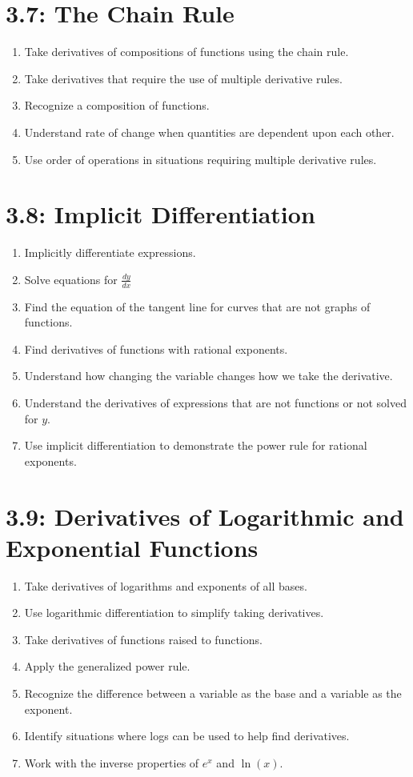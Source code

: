 \documentclass[11pt]{article}
\begin{document}
\section*{3.7: The Chain Rule}
\begin{enumerate}
	\item Take derivatives of compositions of functions using the chain rule.
	\item Take derivatives that require the use of multiple derivative rules.
	\item Recognize a composition of functions.
	\item Understand rate of change when quantities are dependent upon each other.
	\item Use order of operations in situations requiring multiple derivative rules.
\end{enumerate}

\section*{3.8: Implicit Differentiation}
\begin{enumerate}
	\item Implicitly differentiate expressions.
	\item Solve equations for $\frac{dy}{dx}$
	\item Find the equation of the tangent line for curves that are not graphs of functions.
	\item Find derivatives of functions with rational exponents.
	\item Understand how changing the variable changes how we take the derivative.
	\item Understand the derivatives of expressions that are not functions or not solved for $y$.
	\item Use implicit differentiation to demonstrate the power rule for rational exponents.
\end{enumerate}

\section*{3.9: Derivatives of Logarithmic and Exponential Functions}
\begin{enumerate}
	\item Take derivatives of logarithms and exponents of all bases.
	\item Use logarithmic differentiation to simplify taking derivatives.
	\item Take derivatives of functions raised to functions.
	\item Apply the generalized power rule.
	\item Recognize the difference between a variable as the base and a variable as the exponent.
	\item Identify situations where logs can be used to help find derivatives.
	\item Work with the inverse properties of $e^x$ and $\ln(x)$.
\end{enumerate}
\end{document}
